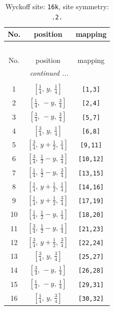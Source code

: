 \documentclass[fleqn,8pt]{jsarticle}
\begin{document}
\renewcommand{\arraystretch}{1.2}
\begin{longtable}{ccc}
\caption{Wyckoff site: {\tt 16k}, site symmetry: {\tt .2.}}
 \\
 \hline \hline
No. & position & mapping \\ \hline \endfirsthead

\multicolumn{2}{l}{\tablename\ \thetable{}} \\
 \hline \hline
No. & position & mapping \\ \hline \endhead

 \hline \hline
\multicolumn{2}{r}{\footnotesize\it continued ...} \\ \endfoot

 \hline \hline
\multicolumn{2}{r}{} \\ \endlastfoot

1 & $\left[ \frac{1}{4},\, y,\, \frac{1}{4} \right]$ & {\tt [1,3]} \\ \hline
2 & $\left[ \frac{1}{4},\, - y,\, \frac{3}{4} \right]$ & {\tt [2,4]} \\ \hline
3 & $\left[ \frac{3}{4},\, - y,\, \frac{3}{4} \right]$ & {\tt [5,7]} \\ \hline
4 & $\left[ \frac{3}{4},\, y,\, \frac{1}{4} \right]$ & {\tt [6,8]} \\ \hline
5 & $\left[ \frac{3}{4},\, y + \frac{1}{2},\, \frac{1}{4} \right]$ & {\tt [9,11]} \\ \hline
6 & $\left[ \frac{3}{4},\, \frac{1}{2} - y,\, \frac{3}{4} \right]$ & {\tt [10,12]} \\ \hline
7 & $\left[ \frac{1}{4},\, \frac{1}{2} - y,\, \frac{3}{4} \right]$ & {\tt [13,15]} \\ \hline
8 & $\left[ \frac{1}{4},\, y + \frac{1}{2},\, \frac{1}{4} \right]$ & {\tt [14,16]} \\ \hline
9 & $\left[ \frac{1}{4},\, y + \frac{1}{2},\, \frac{3}{4} \right]$ & {\tt [17,19]} \\ \hline
10 & $\left[ \frac{1}{4},\, \frac{1}{2} - y,\, \frac{1}{4} \right]$ & {\tt [18,20]} \\ \hline
11 & $\left[ \frac{3}{4},\, \frac{1}{2} - y,\, \frac{1}{4} \right]$ & {\tt [21,23]} \\ \hline
12 & $\left[ \frac{3}{4},\, y + \frac{1}{2},\, \frac{3}{4} \right]$ & {\tt [22,24]} \\ \hline
13 & $\left[ \frac{3}{4},\, y,\, \frac{3}{4} \right]$ & {\tt [25,27]} \\ \hline
14 & $\left[ \frac{3}{4},\, - y,\, \frac{1}{4} \right]$ & {\tt [26,28]} \\ \hline
15 & $\left[ \frac{1}{4},\, - y,\, \frac{1}{4} \right]$ & {\tt [29,31]} \\ \hline
16 & $\left[ \frac{1}{4},\, y,\, \frac{3}{4} \right]$ & {\tt [30,32]} \\
\end{longtable}
\end{document}
